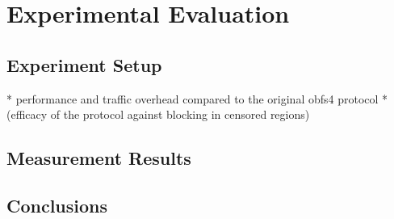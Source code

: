 \chapter{Experimental Evaluation}\label{ch:results}

\section{Experiment Setup} \label{sec:experiment-setup}

* performance and traffic overhead compared to the original obfs4 protocol
* (efficacy of the protocol against blocking in censored regions)

\section{Measurement Results} \label{sec:measurement-results}

\section{Conclusions} \label{sec:conclusion}
